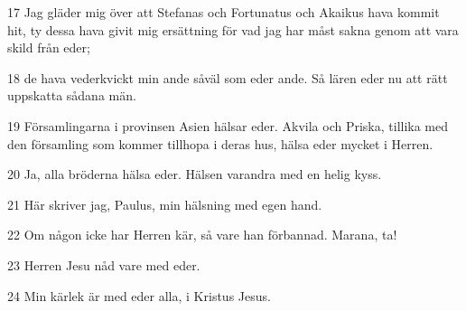 \par 17 Jag gläder mig över att Stefanas och Fortunatus och Akaikus hava kommit hit, ty dessa hava givit mig ersättning för vad jag har måst sakna genom att vara skild från eder;
\par 18 de hava vederkvickt min ande såväl som eder ande. Så lären eder nu att rätt uppskatta sådana män.
\par 19 Församlingarna i provinsen Asien hälsar eder. Akvila och Priska, tillika med den församling som kommer tillhopa i deras hus, hälsa eder mycket i Herren.
\par 20 Ja, alla bröderna hälsa eder. Hälsen varandra med en helig kyss.
\par 21 Här skriver jag, Paulus, min hälsning med egen hand.
\par 22 Om någon icke har Herren kär, så vare han förbannad. Marana, ta!
\par 23 Herren Jesu nåd vare med eder.
\par 24 Min kärlek är med eder alla, i Kristus Jesus.


